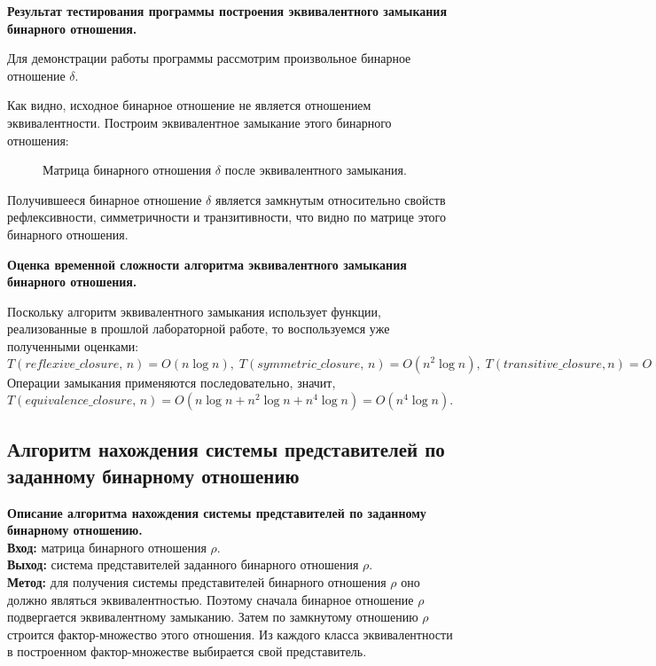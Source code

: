 \documentclass[spec, och, otchet, hidelinks]{SCWorks}
\begin{document}
\par \textbf{Результат тестирования программы построения эквивалентного
  замыкания бинарного отношения.}
\par Для демонстрации работы программы рассмотрим произвольное бинарное
отношение $\delta$.

\par Как видно, исходное бинарное отношение не является отношением эквивалентности.
Построим эквивалентное замыкание этого бинарного отношения:

\begin{figure}[h]
	\caption{Матрица бинарного отношения $\delta$ после эквивалентного замыкания.}
\end{figure}

\par Получившееся бинарное отношение $\delta$ является замкнутым относительно
свойств рефлексивности, симметричности и транзитивности, что видно по матрице
этого бинарного отношения. \\

\par \textbf{Оценка временной сложности алгоритма эквивалентного замыкания
  бинарного отношения.}
\par Поскольку алгоритм эквивалентного замыкания использует функции,
реализованные в прошлой лабораторной работе, то воспользуемся уже полученными
оценками: $T(reflexive\_closure, \, n) = O(n\log n), \; T(symmetric\_closure, \,
n) = O(n^2 \log n), \; T(transitive\_closure, n) = O(n^4 \log n).$ Операции
замыкания применяются последовательно, значит, $T(equivalence\_closure, \, n) =
O(n\log n + n^2 \log n + n^4 \log n) = O(n^4 \log n)$.

\newpage

\subsection{Алгоритм нахождения системы представителей по заданному бинарному
  отношению}

\par \textbf{Описание алгоритма нахождения системы представителей по заданному
  бинарному отношению.} \\
\textbf{Вход:} матрица бинарного отношения $\rho.$ \\
\textbf{Выход:} система представителей заданного бинарного отношения $\rho.$ \\
\textbf{Метод:} для получения системы представителей бинарного отношения $\rho$
оно должно являться эквивалентностью. Поэтому сначала бинарное отношение $\rho$
подвергается эквивалентному замыканию. Затем по замкнутому отношению $\rho$
строится фактор-множество этого отношения. Из каждого класса эквивалентности в
построенном фактор-множестве выбирается свой представитель. \\
\end{document}
